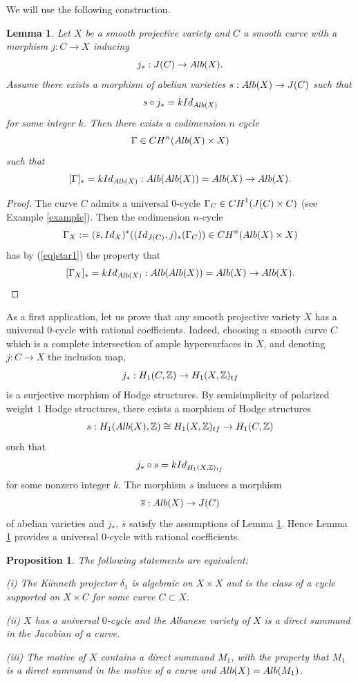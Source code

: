 \documentclass[10pt,a4paper]{amsart}
\newtheorem{lemm}{Lemma}
\newtheorem{prop}{Proposition}
\begin{document}
We will use the following construction.
\begin{lemm} \label{lerefsuggestion} Let $X$ be  a smooth projective variety and $C$ a smooth curve with a morphism
$j: C\rightarrow X$ inducing
$$j_*:J(C)\rightarrow {\rm Alb}(X).$$
Assume there exists a morphism of abelian varieties $s:{\rm Alb}(X)\rightarrow J(C)$ such that
\begin{eqnarray} \label{eqjstar1}s\circ j_*= k{\rm Id}_{{\rm Alb}(X)}\end{eqnarray} for some integer $k$. Then there exists a codimension $n$ cycle
$$\Gamma\in{\rm CH}^n({\rm Alb}(X)\times X)$$
such that
$$[\Gamma]_*=k{\rm Id}_{{\rm Alb}(X)}:{\rm Alb}({\rm Alb}(X))={\rm Alb}(X)\rightarrow {\rm Alb}(X).$$
\end{lemm}
\begin{proof}
The curve $C$ admits a universal $0$-cycle $\Gamma_C\in {\rm CH}^1(J(C)\times C)$ (see Example \ref{example}). Then
the codimension $n$-cycle
$$\Gamma_X:=(\overline{s},{\rm Id}_X)^*(({\rm Id}_{J(C)},j)_*(\Gamma_C))\in{\rm CH}^n({\rm Alb}(X)\times X)$$
 has by (\ref{eqjstar1}) the property that
$$ [\Gamma_X]_*=k {\rm Id}_{{\rm Alb}(X)}:{\rm Alb}({\rm Alb}(X))={\rm Alb}(X)\rightarrow {\rm Alb}(X).$$
\end{proof}
As a first application, let us prove that any smooth projective variety $X$ has a universal $0$-cycle with rational coefficients. Indeed, choosing a smooth  curve $C$ which is a complete intersection of ample hypersurfaces in $X$, and denoting $j: C\rightarrow X$ the inclusion map,
$$j_*:H_1(C,\mathbb{Z})\rightarrow H_1(X,\mathbb{Z})_{\rm tf}$$
is a surjective morphism of Hodge structures. By semisimplicity of polarized weight $1$ Hodge structures,
there exists a morphism of Hodge structures
$$ s: H_1({\rm Alb}(X),\mathbb{Z})\cong  H_1(X,\mathbb{Z})_{\rm tf}\rightarrow H_1(C,\mathbb{Z})$$
such that \begin{eqnarray} \label{eqjstar} j_*\circ s=k{\rm Id}_{H_1(X,\mathbb{Z})_{\rm tf}}\end{eqnarray}
for some nonzero integer $k$. The morphism $s$ induces a morphism
$$\overline{s}: {\rm Alb}(X)\rightarrow J(C)$$
of abelian varieties and $j_*,\,\overline{s}$ satisfy the assumptions of Lemma \ref{lerefsuggestion}. Hence Lemma
 \ref{lerefsuggestion} provides a universal $0$-cycle with rational coefficients.

\begin{prop} \label{prokununiv}The following statements are equivalent:

(i)  The K\"{u}nneth projector $\delta_1$ is algebraic on $X\times X$ and is the class of a cycle supported on $X\times C$ for some curve $C\subset X$.

(ii) $X$  has a universal $0$-cycle and the Albanese variety of $X$ is a direct summand in the Jacobian of a curve.

(iii) The motive of $X$ contains a direct summand $M_1$, with the property that $M_1$ is a direct summand in the motive of a curve and ${\rm Alb}(X)={\rm Alb}(M_1)$.

\end{prop}
\end{document}
